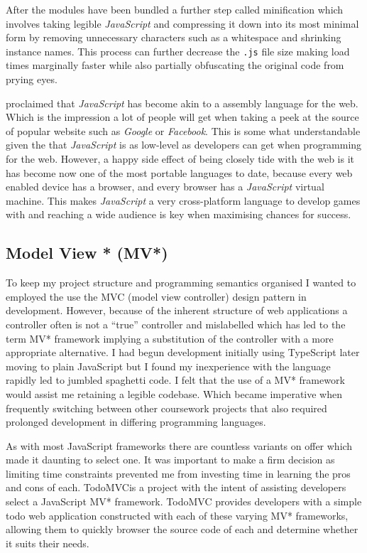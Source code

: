 \documentclass[final]{cmpreport}
\begin{document}
After the modules have been bundled a further step called minification which involves taking legible \textit{JavaScript} and compressing it down into its most minimal form by removing unnecessary characters such as a whitespace and shrinking instance names. This process can further decrease the \texttt{.js} file size making load times marginally faster while also partially obfuscating the original code from prying eyes.

\cite{Hanselman} proclaimed that \textit{JavaScript} has become akin to a assembly language for the web. Which is the impression a lot of people will get when taking a peek at the source of popular website such as \textit{Google} or \textit{Facebook}. This is some what understandable given the that \textit{JavaScript} is as low-level as developers can get when programming for the web. However, a happy side effect of being closely tide with the web is it has become now one of the most portable languages to date, because every web enabled device has a browser, and every browser has a \textit{JavaScript} virtual machine. This makes \textit{JavaScript} a very cross-platform language to develop games with and reaching a wide audience is key when maximising chances for success.

\subsection{Model View * (MV*)}
To keep my project structure and programming semantics organised I wanted to employed the use the MVC (model view controller) design pattern in development. However, because of the inherent structure of web applications a controller often is not a ``true'' controller and mislabelled which has led to the term MV* framework implying a substitution of the controller with a more appropriate alternative. I had begun development initially using TypeScript later moving to plain JavaScript but I found my inexperience with the language rapidly led to jumbled spaghetti code. I felt that the use of a MV* framework would assist me retaining a legible codebase.  Which became imperative when frequently switching between other coursework projects that also required prolonged development in differing programming languages.

As with most JavaScript frameworks there are countless variants on offer which made it daunting to select one. It was important to make a firm decision as limiting time constraints prevented me from investing time in learning the pros and cons of each. TodoMVC\footnotemark[25] is a project with the intent of assisting developers select a JavaScript MV* framework. TodoMVC provides developers with a simple todo web application constructed with each of these varying MV* frameworks, allowing them to quickly browser the source code of each and determine whether it suits their needs.
\end{document}

